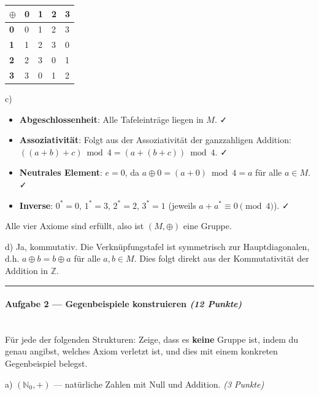 \documentclass[11pt, a4paper]{article}
\begin{document}
{\small
\begin{tabularx}{\linewidth}{XXXXX}
\hline
\rowcolor{tableheadbg}
{\color{white}\textbf{$\oplus$}} & {\color{white}\textbf{0}} & {\color{white}\textbf{1}} & {\color{white}\textbf{2}} & {\color{white}\textbf{3}} \\[2pt]
\hline
\endhead
\hline
\endfoot
\textbf{0} & 0 & 1 & 2 & 3 \\
\textbf{1} & 1 & 2 & 3 & 0 \\
\textbf{2} & 2 & 3 & 0 & 1 \\
\textbf{3} & 3 & 0 & 1 & 2 \\
\end{tabularx}
}


c)

\begin{itemize}
  \item \textbf{Abgeschlossenheit}: Alle Tafeleinträge liegen in $M$. ✓
  \item \textbf{Assoziativität}: Folgt aus der Assoziativität der ganzzahligen Addition: $((a+b)+c) \bmod 4 = (a+(b+c)) \bmod 4$. ✓
  \item \textbf{Neutrales Element}: $e = 0$, da $a \oplus 0 = (a+0) \bmod 4 = a$ für alle $a \in M$. ✓
  \item \textbf{Inverse}: $0^* = 0$, $1^* = 3$, $2^* = 2$, $3^* = 1$ (jeweils $a + a^* \equiv 0 \pmod 4$). ✓
\end{itemize}

Alle vier Axiome sind erfüllt, also ist $(M, \oplus)$ eine Gruppe.


d) Ja, kommutativ. Die Verknüpfungstafel ist symmetrisch zur Hauptdiagonalen, d.h. $a \oplus b = b \oplus a$ für alle $a, b \in M$. Dies folgt direkt aus der Kommutativität der Addition in $\mathbb{Z}$.



\noindent\textcolor{rulegray}{\rule{\linewidth}{0.4pt}}


\paragraph{Aufgabe 2 — Gegenbeispiele konstruieren \textit{(12 Punkte)}}\mbox{}\\[2pt]

Für jede der folgenden Strukturen: Zeige, dass es \textbf{keine} Gruppe ist, indem du genau angibst, welches Axiom verletzt ist, und dies mit einem konkreten Gegenbeispiel belegst.


a) $(\mathbb{N}_0, +)$ — natürliche Zahlen mit Null und Addition. \textit{(3 Punkte)}
\end{document}
